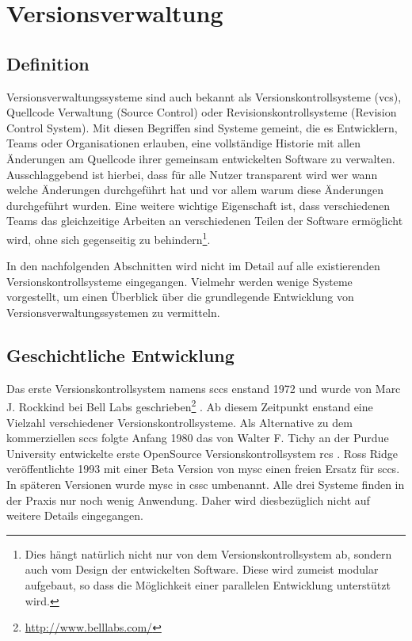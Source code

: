 \chapter{Versionsverwaltung}\label{cha:Versionsverwaltung}
\section{Definition}\label{sec:Definition}
Versionsverwaltungssysteme sind auch bekannt als Versionskontrollsysteme
(\acrlong{vcs}), Quellcode Verwaltung (Source Control) oder
Revisionskontrollsysteme (Revision Control System). Mit diesen Begriffen sind
Systeme gemeint, die es Entwicklern, Teams oder Organisationen erlauben, eine
vollständige Historie mit allen Änderungen am Quellcode ihrer gemeinsam
entwickelten Software zu verwalten. Ausschlaggebend ist hierbei, dass für alle
Nutzer transparent wird wer wann welche Änderungen durchgeführt hat und vor
allem warum diese Änderungen durchgeführt wurden. Eine weitere wichtige
Eigenschaft ist, dass verschiedenen Teams das gleichzeitige Arbeiten an
verschiedenen Teilen der Software ermöglicht wird, ohne sich gegenseitig zu
behindern\footnote{Dies hängt natürlich nicht nur von dem
Versionskontrollsystem ab, sondern auch vom Design der entwickelten Software.
Diese wird zumeist modular aufgebaut, so dass die Möglichkeit einer parallelen
Entwicklung unterstützt wird.}. \cite[S.~381]{cd}

In den nachfolgenden Abschnitten wird nicht im Detail auf alle existierenden
Versionskontrollsysteme eingegangen. Vielmehr werden wenige Systeme
vorgestellt, um einen Überblick über die grundlegende Entwicklung von
Versionsverwaltungssystemen zu vermitteln.

\section{Geschichtliche Entwicklung}\label{sec:GeschichtlicheEntwicklung}
Das erste Versionskontrollsystem namens \acrshort{sccs} enstand 1972 und wurde von Marc
J. Rockkind bei Bell Labs geschrieben\footnote{\url{http://www.belllabs.com/}}
\cite[S.~382]{cd}. Ab diesem Zeitpunkt enstand eine Vielzahl verschiedener
Versionskontrollsysteme. Als Alternative zu dem kommerziellen \acrshort{sccs}
folgte Anfang 1980 das von Walter F. Tichy an der Purdue University entwickelte
erste \gls{OpenSource} Versionskontrollsystem \acrfull{rcs}
\cite{paper:rcs,link:rcs}. Ross Ridge veröffentlichte 1993 mit einer Beta
Version von \acrshort{mysc} einen freien Ersatz für \acrshort{sccs}.  In
späteren Versionen wurde \acrshort{mysc} in \acrfull{cssc}
umbenannt\cite{link:cssc,link:mysc}. Alle drei Systeme finden in der Praxis nur
noch wenig Anwendung. Daher wird diesbezüglich nicht auf weitere Details
eingegangen.

